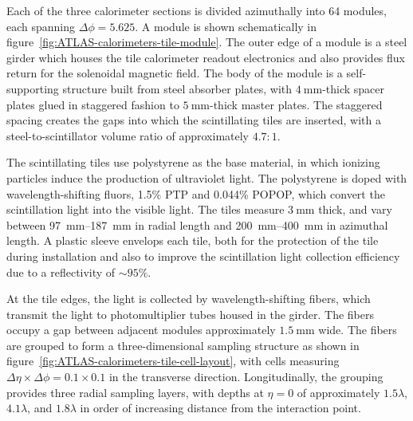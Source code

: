 Each of the three calorimeter sections is divided azimuthally into 64 modules, each spanning $\Delta\phi=5.625$. A module is shown schematically in figure~\ref{fig:ATLAS-calorimeters-tile-module}. The outer edge of a module is a steel girder which houses the tile calorimeter readout electronics and also provides flux return for the solenoidal magnetic field. The body of the module is a self-supporting structure built from steel absorber plates, with $\SI{4}{\milli\meter}$-thick spacer plates glued in staggered fashion to $\SI{5}{\milli\meter}$-thick master plates. The staggered spacing creates the gaps into which the scintillating tiles are inserted, with a steel-to-scintillator volume ratio of approximately $4.7:1$. 

The scintillating tiles use polystyrene as the base material, in which ionizing particles induce the production of ultraviolet light. The polystyrene is doped with wavelength-shifting fluors, 1.5\% PTP and 0.044\% POPOP, which convert the scintillation light into the visible light. The tiles measure $\SI{3}{\milli\meter}$ thick, and vary between \SIrange[range-phrase=-]{97}{187}{\milli\meter} in radial length and \SIrange[range-phrase=-]{200}{400}{\milli\meter} in azimuthal length. A plastic sleeve envelops each tile, both for the protection of the tile during installation and also to improve the scintillation light collection efficiency due to a reflectivity of $\sim 95\%$. 

At the tile edges, the light is collected by wavelength-shifting fibers, which transmit the light to photomultiplier tubes housed in the girder. The fibers occupy a gap between adjacent modules approximately $\SI{1.5}{\milli\meter}$ wide. The fibers are grouped to form a three-dimensional sampling structure as shown in figure~\ref{fig:ATLAS-calorimeters-tile-cell-layout}, with cells measuring $\Delta\eta\times\Delta\phi=0.1\times0.1$ in the transverse direction. Longitudinally, the grouping provides three radial sampling layers, with depths at $\eta=0$ of approximately $1.5\lambda$, $4.1\lambda$, and $1.8\lambda$ in order of increasing distance from the interaction point. 

